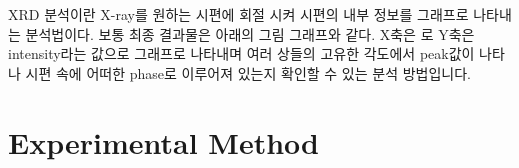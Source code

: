 \documentclass[a4paper, 10pt, nanum]{CSUniSchoolLabReport}
\begin{document}
	XRD 분석이란 X-ray를 원하는 시편에 회절 시켜 시편의 내부 정보를 그래프로 나타내는 분석법이다. 보통 최종 결과물은 아래의 그림 그래프와 같다. X축은 로 Y축은 intensity라는 값으로 그래프로 나타내며 여러 상들의 고유한 각도에서 peak값이 나타나 시편 속에 어떠한 phase로 이루어져 있는지 확인할 수 있는 분석 방법입니다.


\section{Experimental Method}

\end{document}
